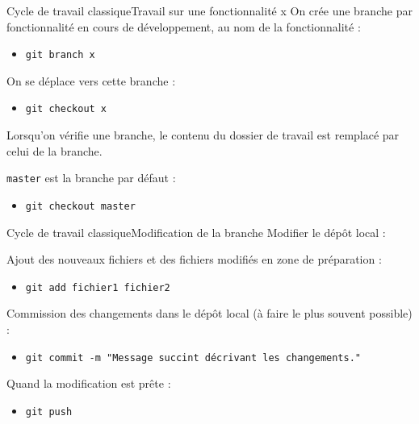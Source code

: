 \begin{frame}{Cycle de travail classique}{Travail sur une fonctionnalité x}
On crée une branche par fonctionnalité en cours de développement, au nom de la fonctionnalité :
\begin{itemize}
	\item \texttt{git branch x}
\end{itemize}

On se déplace vers cette branche :
\begin{itemize}
	\item \texttt{git checkout x}
\end{itemize}

Lorsqu'on vérifie une branche, le contenu du dossier de travail est remplacé par celui de la branche.

\texttt{master} est la branche par défaut :
\begin{itemize}
	\item \texttt{git checkout master}
\end{itemize}
\end{frame}

\begin{frame}{Cycle de travail classique}{Modification de la branche}
Modifier le dépôt local :

Ajout des nouveaux fichiers et  des fichiers modifiés en zone de préparation :
\begin{itemize}
	\item \texttt{git add fichier1 fichier2}
\end{itemize}

Commission des changements dans le dépôt local (à faire le plus souvent possible) :
\begin{itemize}
	\item \texttt{git commit -m "Message succint décrivant les changements."}
\end{itemize}

Quand la modification est prête :
\begin{itemize}
	\item \texttt{git push}
\end{itemize}

\end{frame}

